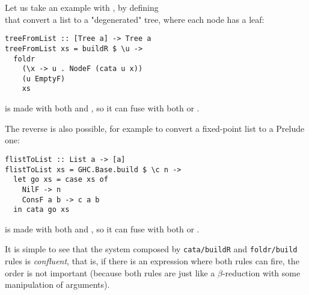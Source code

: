 Let us take an example with , by defining\\  that convert a list to a "degenerated" tree, where each node has a leaf:
\begin{verbatim}
treeFromList :: [Tree a] -> Tree a
treeFromList xs = buildR $ \u ->
  foldr
    (\x -> u . NodeF (cata u x))
    (u EmptyF)
    xs
\end{verbatim}
\noindent {} is made with both  and , so it can fuse with both  or .

The reverse is also possible, for example to convert a fixed-point list to a Prelude one:
\begin{verbatim}
flistToList :: List a -> [a]
flistToList xs = GHC.Base.build $ \c n ->
  let go xs = case xs of
    NilF -> n
    ConsF a b -> c a b
  in cata go xs
\end{verbatim}
\noindent {} is made with both  and , so it can fuse with both  or .

It is simple to see that the system composed by \verb|cata/buildR| and \verb|foldr/build| rules is \emph{confluent}, that is, if there is an expression where both rules can fire, the order is not important (because both rules are just like a $\beta$-reduction with some manipulation of arguments).